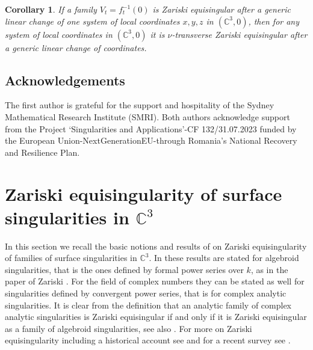 \documentclass[11pt,a4paper]{amsart}
\newcommand{\1}{{1\!\!1}}
\numberwithin{equation}{section}
\theoremstyle{plain}%
\newtheorem{cor}[thm]{Corollary}
\theoremstyle{definition}
\theoremstyle{definition}
\theoremstyle{remark}
\newcommand{\C}{\mathbb{C}}
\newcommand{\kk}{{k}}
\renewcommand{\1}{\mathbf{1}}
\newcommand{\inv}{^{-1}}
\newcommand{\unt}{$\nu$-transverse }
\begin{document}
\begin{cor}\label{cor:indep}
If a family $V_t = f_t\inv (0)$ is  Zariski equisingular after a generic linear change of one system of local coordinates $x,y,z$ in $(\C^3,0)$, then for any system of local coordinates in $(\C^3,0)$ it is \unt Zariski equisingular after a generic linear change of coordinates.      
\end{cor}

\subsection*{Acknowledgements}
{The first author is grateful for the support and hospitality of the Sydney Mathematical Research Institute (SMRI). %
Both authors  acknowledge support from the Project ‘Singularities and Applications’-CF
132/31.07.2023 funded by the European Union-NextGenerationEU-through Romania’s National
Recovery and Resilience Plan.
}



\section{Zariski equisingularity of surface singularities in $\C^3$}
\label{sec:previouspaper}


In this section we recall the basic notions and results of \cite{PP24} on  Zariski equisingularity of families 
of surface singularities in $\C^3$. In \cite{PP24} these results are stated for algebroid singularities, that is the ones defined by formal power series over $\kk$, as in the paper of Zariski \cite{Zariski1979} .    
For the field of complex numbers they can be stated as well for singularities defined by convergent power series, that is for complex analytic singularities.  
It is clear from the definition that an analytic family of complex analytic singularities is Zariski equisingular if and only if it is Zariski equisingular as a family of algebroid singularities, see also \cite[section 1.3]{PP24}.  
For more on Zariski equisingularity including a historical account see \cite{Lip97} and for a recent survey see \cite{MR4367438}. 
\smallskip
\end{document}
